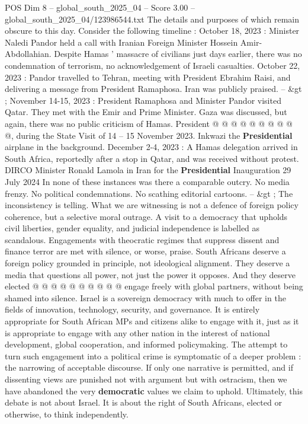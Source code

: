 \begin{textsample}{POS Dim 8 – global\_south\_2025\_04 – Score 3.00 – global\_south\_2025\_04/123986544.txt}
The details and purposes of which remain obscure to this day.
Consider the following timeline : October 18, 2023 : Minister Naledi Pandor held a call with Iranian Foreign Minister Hossein Amir-Abdollahian.
Despite Hamas ' massacre of civilians just days earlier, there was no condemnation of terrorism, no acknowledgement of Israeli casualties.
October 22, 2023 : Pandor travelled to Tehran, meeting with President Ebrahim Raisi, and delivering a message from President Ramaphosa.
Iran was publicly praised. -- \&gt ; November 14-15, 2023 : President Ramaphosa and Minister Pandor visited Qatar.
They met with the Emir and Prime Minister.
Gaza was discussed, but again, there was no public criticism of Hamas.
President @ @ @ @ @ @ @ @ @ @, during the State Visit of 14 -- 15 November 2023.
Inkwazi the \textbf{Presidential} airplane in the background.
December 2-4, 2023 : A Hamas delegation arrived in South Africa, reportedly after a stop in Qatar, and was received without protest.
DIRCO Minister Ronald Lamola in Iran for the \textbf{Presidential} Inauguration 29 July 2024 In none of these instances was there a comparable outcry.
No media frenzy.
No political condemnations.
No scathing editorial cartoons. -- \&gt ; The inconsistency is telling.
What we are witnessing is not a defence of foreign policy coherence, but a selective moral outrage.
A visit to a democracy that upholds civil liberties, gender equality, and judicial independence is labelled as scandalous.
Engagements with theocratic regimes that suppress dissent and finance terror are met with silence, or worse, praise.
South Africans deserve a foreign policy grounded in principle, not ideological alignment.
They deserve a media that questions all power, not just the power it opposes.
And they deserve elected @ @ @ @ @ @ @ @ @ @ engage freely with global partners, without being shamed into silence.
Israel is a sovereign democracy with much to offer in the fields of innovation, technology, security, and governance.
It is entirely appropriate for South African MPs and citizens alike to engage with it, just as it is appropriate to engage with any other nation in the interest of national development, global cooperation, and informed policymaking.
The attempt to turn such engagement into a political crime is symptomatic of a deeper problem : the narrowing of acceptable discourse.
If only one narrative is permitted, and if dissenting views are punished not with argument but with ostracism, then we have abandoned the very \textbf{democratic} values we claim to uphold.
Ultimately, this debate is not about Israel.
It is about the right of South Africans, elected or otherwise, to think independently.

\end{textsample}
